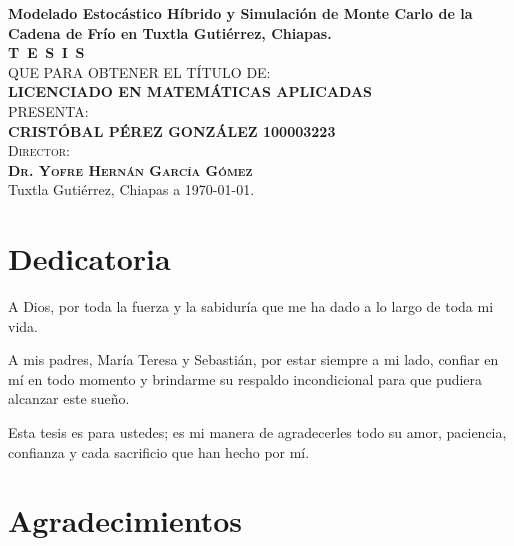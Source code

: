 \begin{titlepage}
\begin{minipage}[t][0.95\textheight][c]{0.76\textwidth}
            \begin{center}
                \vspace{0.7cm}
                {\Large\bfseries Modelado Estocástico Híbrido y Simulación de Monte Carlo de la Cadena de Frío en Tuxtla Gutiérrez, Chiapas.}\\[2cm]
                \textsc{\huge \textbf{T\, E\, S\, I\, S}}\\[1.5cm]
                \textsc{\large QUE PARA OBTENER EL TÍTULO DE:}\\[0.3cm]
                \textbf{\textsc{LICENCIADO EN MATEMÁTICAS APLICADAS}}\\[1.5cm]
                \textsc{\large PRESENTA:}\\[0.3cm]
                \textbf{\textsc{\large {CRISTÓBAL PÉREZ GONZÁLEZ 100003223}}}\\[2cm]
                {\large\scshape Director:\\[0.3cm]
                {\textbf{\large Dr. Yofre Hernán García Gómez }}}\\[2.0cm]
                \large{Tuxtla Gutiérrez, Chiapas a \today.}

            \end{center}
\end{minipage}
\end{titlepage}

\pagebreak[2]

\chapter*{Dedicatoria}
\begin{flushright}
\itshape
\setlength{\parindent}{0pt} %
\setlength{\parskip}{1.2\baselineskip} %

A Dios, por toda la fuerza y la sabiduría que me ha dado a lo largo de toda mi vida.

A mis padres, María Teresa y Sebastián, por estar siempre a mi lado, confiar en mí en todo momento y brindarme su respaldo incondicional para que pudiera alcanzar este sueño.

Esta tesis es para ustedes; es mi manera de agradecerles todo su amor, paciencia, confianza y cada sacrificio que han hecho por mí.
\end{flushright}


\chapter*{Agradecimientos}

